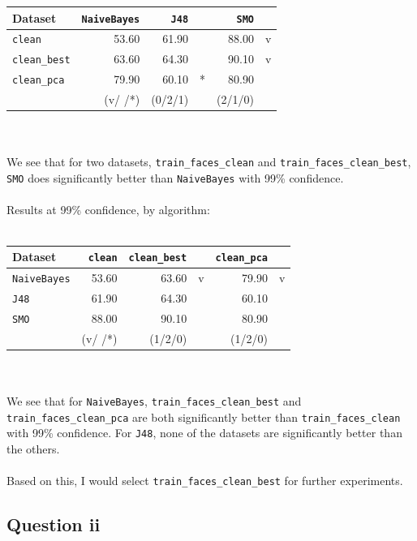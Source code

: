 \documentclass[a4paper]{article}
\begin{document}
\begin{tabular}{lr|rrrr}
Dataset           & {\tt NaiveBayes} & {\tt J48} & & {\tt SMO} & \\
\hline
{\tt clean}       &            53.60 &     61.90 & &    88.00 &v\\
{\tt clean\_best} &            63.60 &     64.30 & &    90.10 &v\\
{\tt clean\_pca}  &            79.90 &     60.10 &*&    80.90 & \\
\hline
                  &           (v/ /*)&    (0/2/1)& &   (2/1/0)&
\end{tabular}\\
\\
We see that for two datasets, {\tt train\_faces\_clean} and {\tt train\_faces\_clean\_best}, {\tt SMO} does significantly better than {\tt NaiveBayes} with 99\% confidence.\\
\\
Results at 99\% confidence, by algorithm:\\
\\
\begin{tabular}{lr|rrrr}
Dataset          & {\tt clean} & {\tt clean\_best} & & {\tt clean\_pca} & \\
\hline
{\tt NaiveBayes} &       53.60 &             63.60 &v&            79.90 &v\\
{\tt J48}        &       61.90 &             64.30 & &            60.10 & \\
{\tt SMO}        &       88.00 &             90.10 & &            80.90 & \\
\hline
                 &      (v/ /*)&            (1/2/0)& &           (1/2/0)&
\end{tabular}\\
\\
We see that for {\tt NaiveBayes}, {\tt train\_faces\_clean\_best} and {\tt train\_faces\_clean\_pca} are both significantly better than {\tt train\_faces\_clean} with 99\% confidence. For {\tt J48}, none of the datasets are significantly better than the others.\\
\\
Based on this, I would select {\tt train\_faces\_clean\_best} for further experiments.

\subsection*{Question ii}
\end{document}

